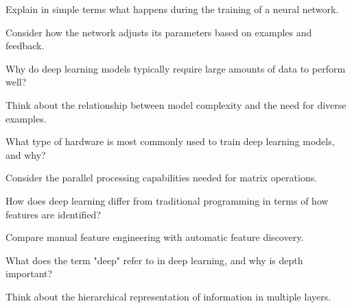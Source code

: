 \begin{exercisebox}[easy]
\begin{problem}
Explain in simple terms what happens during the training of a neural network.
\end{problem}
\begin{hintbox}
Consider how the network adjusts its parameters based on examples and feedback.
\end{hintbox}
\end{exercisebox}


\begin{exercisebox}[easy]
\begin{problem}
Why do deep learning models typically require large amounts of data to perform well?
\end{problem}
\begin{hintbox}
Think about the relationship between model complexity and the need for diverse examples.
\end{hintbox}
\end{exercisebox}


\begin{exercisebox}[easy]
\begin{problem}
What type of hardware is most commonly used to train deep learning models, and why?
\end{problem}
\begin{hintbox}
Consider the parallel processing capabilities needed for matrix operations.
\end{hintbox}
\end{exercisebox}


\begin{exercisebox}[easy]
\begin{problem}
How does deep learning differ from traditional programming in terms of how features are identified?
\end{problem}
\begin{hintbox}
Compare manual feature engineering with automatic feature discovery.
\end{hintbox}
\end{exercisebox}


\begin{exercisebox}[easy]
\begin{problem}
What does the term "deep" refer to in deep learning, and why is depth important?
\end{problem}
\begin{hintbox}
Think about the hierarchical representation of information in multiple layers.
\end{hintbox}
\end{exercisebox}


